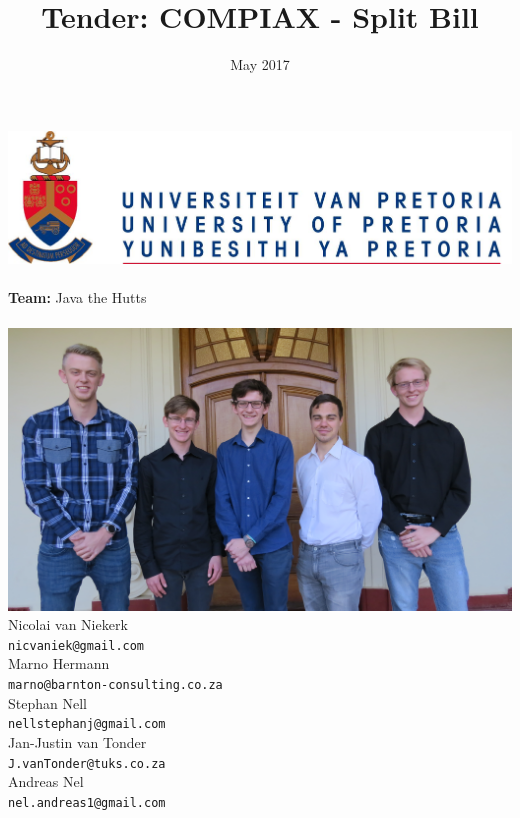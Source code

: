 \documentclass{article}
\title{Tender: COMPIAX - Split Bill}
\date{May 2017}
\begin{document}
\makeatletter
    \begin{titlepage}
        \begin{center}
            \includegraphics[width=0.7\linewidth]{img/up.png}\\[4ex]
            {\huge \bfseries \@title }\\[2ex]
            {\LARGE \textbf{Team:} Java the Hutts}\\[2ex]
            {\LARGE \@date}\\[2ex]
            {\includegraphics[width=\linewidth]{img/team_photo.jpg}}\\[2ex]
            {\large  Nicolai van Niekerk\\ \texttt{nicvaniek@gmail.com}}\\[2ex]
            {\large  Marno Hermann\\ \texttt{marno@barnton-consulting.co.za}}\\[2ex]
            {\large  Stephan Nell\\ \texttt{nellstephanj@gmail.com}}\\[2ex]
            {\large  Jan-Justin van Tonder\\ \texttt{J.vanTonder@tuks.co.za}}\\[2ex]
            {\large  Andreas Nel\\ \texttt{nel.andreas1@gmail.com}}\\[2ex]
        \end{center}
        
    \end{titlepage}
\makeatother
\end{document}
